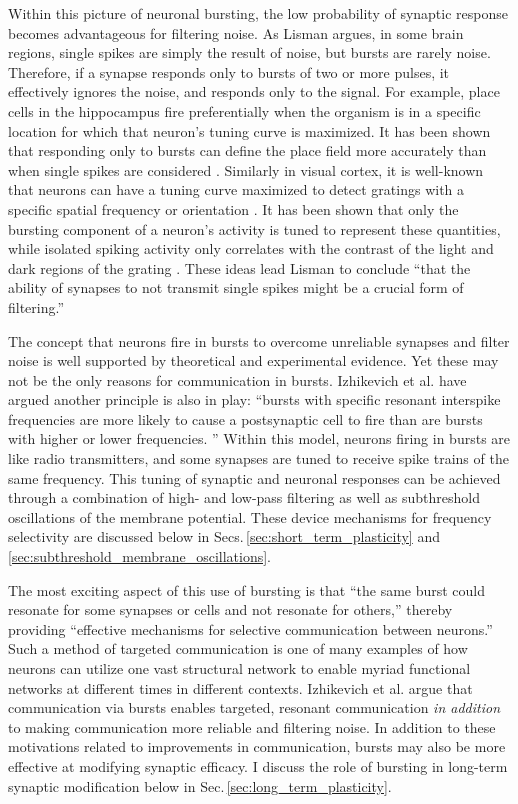 Within this picture of neuronal bursting, the low probability of synaptic response becomes advantageous for filtering noise. As Lisman argues, in some brain regions, single spikes are simply the result of noise, but bursts are rarely noise. Therefore, if a synapse responds only to bursts of two or more pulses, it effectively ignores the noise, and responds only to the signal. For example, place cells in the hippocampus \cite{frbu2018} fire preferentially when the organism is in a specific location for which that neuron's tuning curve is maximized. It has been shown that responding only to bursts can define the place field more accurately than when single spikes are considered \cite{otei1991}. Similarly in visual cortex, it is well-known that neurons can have a tuning curve maximized to detect gratings with a specific spatial frequency or orientation \cite{daab2001}. It has been shown that only the bursting component of a neuron's activity is tuned to represent these quantities, while isolated spiking activity only correlates with the contrast of the light and dark regions of the grating \cite{cama1981}. These ideas lead Lisman to conclude ``that the ability of synapses to not transmit single spikes might be a crucial form of filtering.'' \cite{li1997} 

The concept that neurons fire in bursts to overcome unreliable synapses and filter noise is well supported by theoretical and experimental evidence. Yet these may not be the only reasons for communication in bursts. Izhikevich et al. have argued another principle is also in play: ``bursts with specific resonant interspike frequencies are more likely to cause a postsynaptic cell to fire than are bursts with higher or lower frequencies. '' \cite{izde2003} Within this model, neurons firing in bursts are like radio transmitters, and some synapses are tuned to receive spike trains of the same frequency. This tuning of synaptic and neuronal responses can be achieved through a combination of high- and low-pass filtering as well as subthreshold oscillations of the membrane potential. These device mechanisms for frequency selectivity are discussed below in Secs.\,\ref{sec:short_term_plasticity} and \ref{sec:subthreshold_membrane_oscillations}. 

The most exciting aspect of this use of bursting is that ``the same burst could resonate for some synapses or cells and not resonate for others,'' thereby providing ``effective mechanisms for selective communication between neurons.'' Such a method of targeted communication is one of many examples of how neurons can utilize one vast structural network to enable myriad functional networks at different times in different contexts. Izhikevich et al. argue that communication via bursts enables targeted, resonant communication \textit{in addition} to making communication more reliable and filtering noise. In addition to these motivations related to improvements in communication, bursts may also be more effective at modifying synaptic efficacy. I discuss the role of bursting in long-term synaptic modification below in Sec.\,\ref{sec:long_term_plasticity}.

